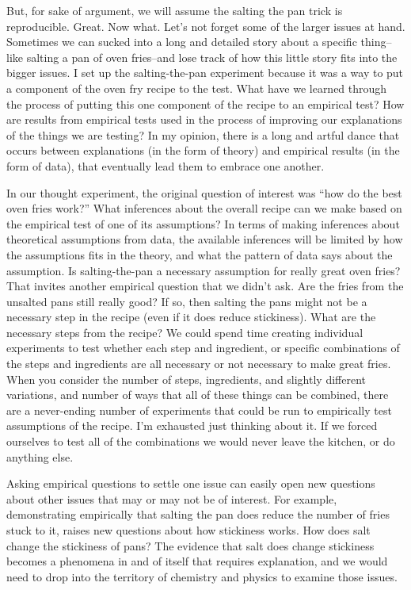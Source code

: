 \documentclass[
  oneside,
  12pt]{crumpbook}
\begin{document}
But, for sake of argument, we will assume the salting the pan trick is reproducible. Great. Now what. Let's not forget some of the larger issues at hand. Sometimes we can sucked into a long and detailed story about a specific thing-- like salting a pan of oven fries--and lose track of how this little story fits into the bigger issues. I set up the salting-the-pan experiment because it was a way to put a component of the oven fry recipe to the test. What have we learned through the process of putting this one component of the recipe to an empirical test? How are results from empirical tests used in the process of improving our explanations of the things we are testing? In my opinion, there is a long and artful dance that occurs between explanations (in the form of theory) and empirical results (in the form of data), that eventually lead them to embrace one another.

In our thought experiment, the original question of interest was ``how do the best oven fries work?'' What inferences about the overall recipe can we make based on the empirical test of one of its assumptions? In terms of making inferences about theoretical assumptions from data, the available inferences will be limited by how the assumptions fits in the theory, and what the pattern of data says about the assumption. Is salting-the-pan a necessary assumption for really great oven fries? That invites another empirical question that we didn't ask. Are the fries from the unsalted pans still really good? If so, then salting the pans might not be a necessary step in the recipe (even if it does reduce stickiness). What are the necessary steps from the recipe? We could spend time creating individual experiments to test whether each step and ingredient, or specific combinations of the steps and ingredients are all necessary or not necessary to make great fries. When you consider the number of steps, ingredients, and slightly different variations, and number of ways that all of these things can be combined, there are a never-ending number of experiments that could be run to empirically test assumptions of the recipe. I'm exhausted just thinking about it. If we forced ourselves to test all of the combinations we would never leave the kitchen, or do anything else.

Asking empirical questions to settle one issue can easily open new questions about other issues that may or may not be of interest. For example, demonstrating empirically that salting the pan does reduce the number of fries stuck to it, raises new questions about how stickiness works. How does salt change the stickiness of pans? The evidence that salt does change stickiness becomes a phenomena in and of itself that requires explanation, and we would need to drop into the territory of chemistry and physics to examine those issues.
\end{document}
